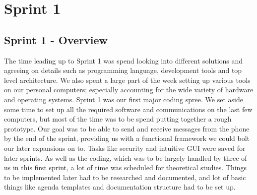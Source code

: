 \chapter{Sprint 1}

\section{Sprint 1 - Overview}
The time leading up to Sprint 1 was spend looking into different solutions and agreeing on details such as programming language, development tools and top level architecture. We also spent a large part of the week setting up various tools on our personal computers; especially accounting for the wide variety of hardware and operating systems.
\newline
\newline
Sprint 1 was our first major coding spree. We set aside some time to set up all the required software and communications on the last few computers, but most of the time was to be spend putting together a rough prototype. Our goal was to be able to send and receive messages from the phone by the end of the sprint, providing us with a functional framework we could bolt our later expansions on to. Tasks like security and intuitive GUI were saved for later sprints.
\newline
\newline
As well as the coding, which was to be largely handled by three of us in this first sprint, a lot of time was scheduled for theoretical studies. Things to be implemented later had to be researched and documented, and lot of basic things like agenda templates and documentation structure had to be set up.